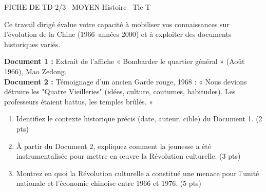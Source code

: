 \documentclass[11pt]{article}
\begin{document}
\begin{tcolorbox}[enhanced,colback=popink,colframe=popink,arc=10pt,boxrule=0pt,left=12pt,right=12pt,top=9pt,bottom=9pt]
{\color{white}\popxbold\small FICHE DE TD 2/3 \textbullet\ MOYEN \hfill Histoire \textbullet\ Tle T\par}
\end{tcolorbox}
\vspace{4pt}
Ce travail dirigé évalue votre capacité à mobiliser vos connaissances sur l'évolution de la Chine (1966--années 2000) et à exploiter des documents historiques variés.

\begin{exercice}
\textbf{Document 1 :} Extrait de l'affiche « Bombarder le quartier général » (Août 1966), Mao Zedong.\\
\textbf{Document 2 :} Témoignage d'un ancien Garde rouge, 1968 : « Nous devions détruire les "Quatre Vieilleries" (idées, culture, coutumes, habitudes). Les professeurs étaient battus, les temples brûlés. »\\
\begin{enumerate}
\item Identifiez le contexte historique précis (date, auteur, cible) du Document 1. \hfill (2 pts)
\item À partir du Document 2, expliquez comment la jeunesse a été instrumentalisée pour mettre en œuvre la Révolution culturelle. \hfill (3 pts)
\item Montrez en quoi la Révolution culturelle a constitué une menace pour l'unité nationale et l'économie chinoise entre 1966 et 1976. \hfill (5 pts)
\end{enumerate}
\end{exercice}
\end{document}
